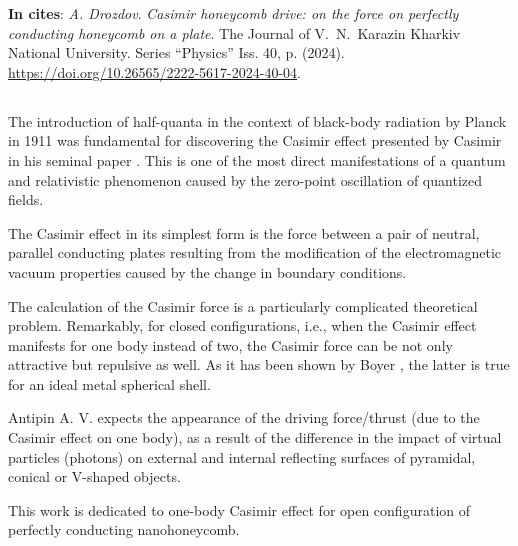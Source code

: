 \documentclass[twoside, 10pt, ptm]{article}
\def\myname{A. Drozdov}
\def\mytitle{Casimir honeycomb drive: on the force on perfectly conducting honeycomb on a plate}
\def\mydoi{10.26565/2222-5617-2024-40-04}
\def\envisnyk{The Journal of V.~N.~Karazin Kharkiv National University. Series “Physics” Iss. 40, p. (2024)}
\def\myvspacebeforesubsection{-2.0mm}
\def\myvspaceaftersubsection{-2.5mm}
\begin{document}
\vspace{5mm}

\noindent
\textbf{In cites}: \textit{\myname}. \textit{\mytitle}. {\envisnyk}. \href{https://doi.org/\mydoi}{https://doi.org/\mydoi}.

\vspace{5mm}

\pagebreak

\begin{multicols}{2}

\vspace{\myvspacebeforesubsection}
    \subsection*{}\label{introduction}
\vspace{\myvspaceaftersubsection}

The introduction of half-quanta in the context of
black-body radiation by Planck in 1911 was fundamental for discovering the Casimir effect
presented by Casimir in his seminal paper \cite{Casimir1948}.
This is one of the most direct
manifestations of a quantum and relativistic phenomenon caused by the
zero-point oscillation of quantized fields.

The Casimir effect in its simplest form is the force between a pair of
neutral, parallel conducting plates resulting from the modification of
the electromagnetic vacuum properties caused by the change in boundary conditions.

The calculation of the Casimir force is a particularly complicated
theoretical problem. Remarkably, for closed configurations, i.e., when the
Casimir effect manifests for one body instead of two, the Casimir force can be not
only attractive but repulsive as well. As it has been shown by Boyer
\cite{Boyer1968}, the latter is true for an ideal metal spherical shell.

Antipin A. V. \cite{Antipin2012} expects the appearance of the driving force/thrust (due to the Casimir
effect on one body), as a result of the difference in the impact of virtual particles (photons) on
external and internal reflecting surfaces of pyramidal, conical or \mbox{V-shaped} objects.

This work is dedicated to one-body Casimir effect for open
configuration of perfectly conducting nanohoneycomb.




\end{multicols}
\end{document}

